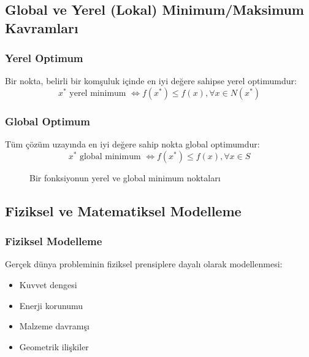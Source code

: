 \subsection{Global ve Yerel (Lokal) Minimum/Maksimum Kavramları}

\subsubsection{Yerel Optimum}
Bir nokta, belirli bir komşuluk içinde en iyi değere sahipse yerel optimumdur:
\begin{equation}
x^* \text{ yerel minimum } \Leftrightarrow f(x^*) \leq f(x), \forall x \in N(x^*)
\end{equation}

\subsubsection{Global Optimum}
Tüm çözüm uzayında en iyi değere sahip nokta global optimumdur:
\begin{equation}
x^* \text{ global minimum } \Leftrightarrow f(x^*) \leq f(x), \forall x \in S
\end{equation}

\begin{figure}
\centering
{}
\caption{Bir fonksiyonun yerel ve global minimum noktaları}
\label{fig:local_global}
\end{figure}

\subsection{Fiziksel ve Matematiksel Modelleme}

\subsubsection{Fiziksel Modelleme}
Gerçek dünya probleminin fiziksel prensiplere dayalı olarak modellenmesi:
\begin{itemize}
    \item Kuvvet dengesi
    \item Enerji korunumu
    \item Malzeme davranışı
    \item Geometrik ilişkiler
\end{itemize}

